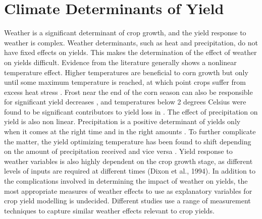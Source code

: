  

\section{Climate Determinants of Yield}

Weather is a significant determinant of crop growth, and the yield response to weather is complex. Weather determinants, such as heat and precipitation, do not have fixed effects on yields. This makes the determination of the effect of weather on yields difficult.  Evidence from the literature generally shows a nonlinear temperature effect. Higher temperatures are beneficial to corn growth but only until some maximum temperature is reached, at which point crops suffer from excess heat stress \citep{schlenker2009nonlinear}. Frost near the end of the corn season can also be responsible for significant yield decreases \citep{OMAFRA}, and temperatures below 2 degrees Celsius were found to be significant contributors to yield loss in \cite{tolhurst2015cold}. The effect of precipitation on yield is also non linear. Precipitation is a positive determinant of yields only when it comes at the right time and in the right amounts \citep{hansen1991farmer, tan2003impacts}. To further complicate the matter, the yield optimizing temperature has been found to shift depending on the amount of precipitation received and vice versa \citep{tan2003impacts, schlenker2009nonlinear}. Yield response to weather variables is also highly dependent on the crop growth stage, as different levels of inputs are required at different times (Dixon et al., 1994). In addition to the complications involved in determining the impact of weather on yields, the most appropriate measures of weather effects to use as explanatory variables for crop yield modelling is undecided. Different studies use a range of measurement techniques to capture similar weather effects relevant to crop yields. 


